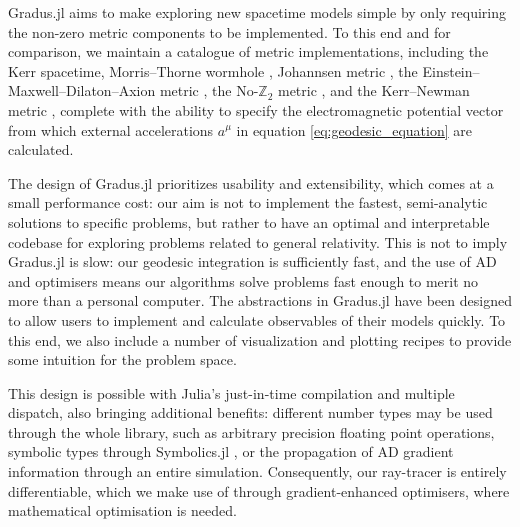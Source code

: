 \documentclass[fleqn,usenatbib]{mnras}
\newcommand{\Gradus}{{\sc Gradus.jl}\xspace}
\begin{document}
\Gradus aims to make exploring new spacetime models simple by only requiring the
non-zero metric components to be implemented. To this end and for comparison, we
maintain a catalogue of metric implementations, including the Kerr spacetime,
Morris--Thorne wormhole \citep{morris_wormholes_1988}, Johannsen metric
\cite{johannsen_regular_2013}, the Einstein--Maxwell--Dilaton--Axion metric
\citep{garcia_class_1995}, the No-$\mathbb{Z}_2$ metric
\citep{chen_observational_2024}, and the Kerr--Newman
metric \citep[e.g.][]{hackmann_charged_2013}, complete with the ability to
specify the electromagnetic potential vector from which external accelerations
$a^\mu$ in equation \eqref{eq:geodesic_equation} are calculated.

The design of \Gradus prioritizes usability and extensibility, which comes at a
small performance cost: our aim is not to implement the fastest, semi-analytic
solutions to specific problems, but rather to have an optimal and interpretable
codebase for exploring problems related to general relativity.  This is not to
imply \Gradus is slow: our geodesic integration is sufficiently fast, and the
use of AD and optimisers means our algorithms solve problems fast enough to
merit no more than a personal computer. The abstractions in \Gradus have been
designed to allow users to implement and calculate observables of their models
quickly. To this end, we also include a number of visualization and plotting
recipes to provide some intuition for the problem space.

This design is possible with Julia's just-in-time compilation and multiple
dispatch, also bringing additional benefits: different number types may be used
through the whole library, such as arbitrary precision floating point
operations, symbolic types through Symbolics.jl \citep{symbolics_julia}, or the
propagation of AD gradient information through an entire simulation.
Consequently, our ray-tracer is entirely differentiable, which we make use of
through gradient-enhanced optimisers, where mathematical optimisation is needed.


\end{document}
